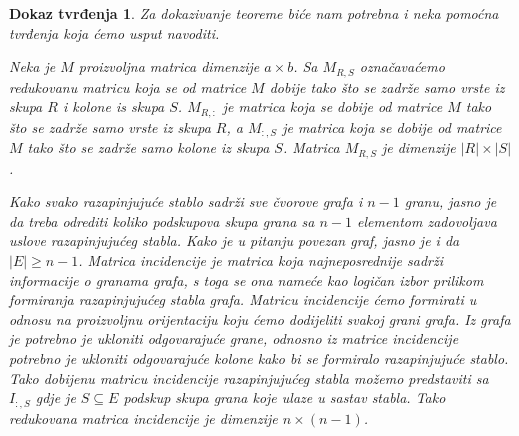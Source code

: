 \documentclass[11pt]{article}
\newtheorem*{custom_proof}{Dokaz tvrđenja}
\begin{document}
		\begin{custom_proof} Za dokazivanje teoreme biće nam potrebna i neka pomoćna tvrđenja koja ćemo usput navoditi.

		Neka je $M$ proizvoljna matrica dimenzije $a \times b$. Sa $M_{R,S}$ označavaćemo redukovanu matricu koja se od matrice $M$ dobije tako što se zadrže samo vrste iz skupa $R$ i kolone is skupa $S$. 
		$M_{R,:}$ je matrica koja se dobije od matrice $M$ tako što se zadrže samo vrste iz skupa $R$, a $M_{:,S}$ je matrica koja se dobije od matrice $M$ tako što se zadrže samo kolone iz skupa $S$.
		Matrica $M_{R,S}$ je dimenzije $|R| \times |S|$.
	
		Kako svako razapinjujuće stablo sadrži sve čvorove grafa i $n-1$ granu,
		jasno je da treba odrediti koliko podskupova skupa grana sa $n-1$ elementom zadovoljava uslove razapinjujućeg stabla.
		Kako je u pitanju povezan graf, jasno je i da $|E| \geq n-1$.
		Matrica incidencije je matrica koja najneposrednije sadrži informacije o granama grafa,
		s toga se ona nameće kao logičan izbor prilikom formiranja razapinjujućeg stabla grafa. Matricu incidencije ćemo formirati u odnosu na proizvoljnu orijentaciju koju ćemo dodijeliti svakoj grani grafa.
	    Iz grafa je potrebno je ukloniti odgovarajuće grane, odnosno iz matrice incidencije potrebno je ukloniti odgovarajuće kolone kako bi se formiralo razapinjujuće stablo. 
		Tako dobijenu matricu incidencije razapinjujućeg stabla možemo predstaviti sa $I_{:,S}$ gdje je $S \subseteq E$ podskup skupa grana koje ulaze u sastav stabla.
		Tako redukovana matrica incidencije je dimenzije $n \times (n - 1)$.
	

\end{custom_proof}
\end{document}
